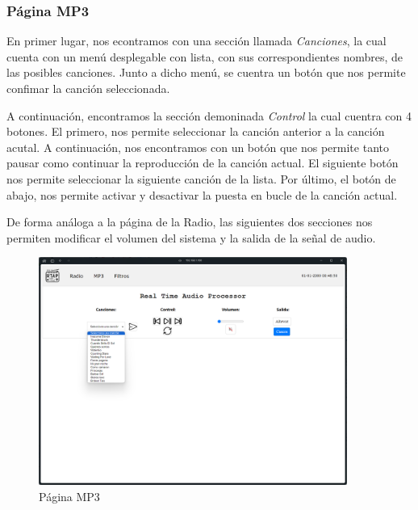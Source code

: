 \subsubsection{Página MP3}
En primer lugar, nos econtramos con una sección llamada \textit{Canciones}, la cual cuenta con un menú desplegable con lista, con sus correspondientes nombres, de las posibles canciones. Junto a dicho menú, se cuentra un botón que nos permite confimar la canción seleccionada.

A continuación, encontramos la sección demoninada \textit{Control} la cual cuentra con 4 botones. El primero, nos permite seleccionar la canción anterior a la canción acutal. A continuación, nos encontramos con un botón que nos permite tanto pausar como continuar la reproducción de la canción actual. El siguiente botón nos permite seleccionar la siguiente canción de la lista. Por último, el botón de abajo, nos permite activar y desactivar la puesta en bucle de la canción actual.

De forma análoga a la página de la Radio, las siguientes dos secciones nos permiten modificar el volumen del sistema y la salida de la señal de audio.

\begin{figure}[h]
    \centering
    \includegraphics[width=0.9\textwidth]{images/3/3-1/3-1-1-3/Pagina_MP3.png}
    \caption{Página MP3}
    \label{fig:3-1-1-3-MP3}
\end{figure}